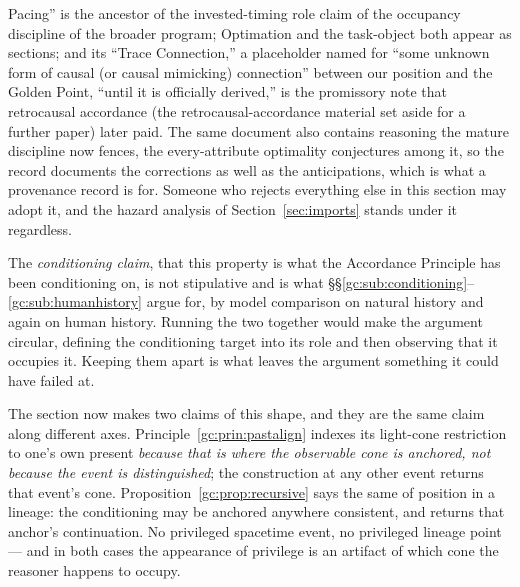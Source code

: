 {Pacing'' is the ancestor of the invested-timing role claim of
the occupancy discipline of the broader program; Optimation and the task-object
both appear as sections; and its ``Trace Connection,'' a
placeholder named for ``some unknown form of causal (or causal
mimicking) connection'' between our position and the Golden Point,
``until it is officially derived,'' is the promissory note that
retrocausal accordance (the retrocausal-accordance material set aside for a further paper) later paid. The same
document also contains reasoning the mature discipline now fences,
the every-attribute optimality conjectures among it, so the record
documents the corrections as well as the anticipations, which is
what a provenance record is for.} Someone who rejects everything else in this section may
adopt it, and the hazard analysis of Section~\ref{sec:imports} stands under it
regardless.

The \emph{conditioning claim}, that this property is what the
Accordance Principle has been conditioning on, is not stipulative and
is what \S\S\ref{gc:sub:conditioning}--\ref{gc:sub:humanhistory} argue
for, by model comparison on natural history and again on human history. Running
the two together would make the argument circular, defining the
conditioning target into its role and then observing that it occupies
it. Keeping them apart is what leaves the argument something it could
have failed at.

\begin{remark}
\label{gc:rem:twoprivilege}
The section now makes two claims of this shape, and they are the same
claim along different axes.
Principle~\ref{gc:prin:pastalign} indexes its light-cone restriction to
one's own present \emph{because that is where the observable cone is
anchored, not because the event is distinguished}; the construction at
any other event returns that event's cone.
Proposition~\ref{gc:prop:recursive} says the same of position in a
lineage: the conditioning may be anchored anywhere consistent, and
returns that anchor's continuation. No privileged spacetime event, no
privileged lineage point --- and in both cases the appearance of
privilege is an artifact of which cone the reasoner happens to occupy.
\end{remark}

